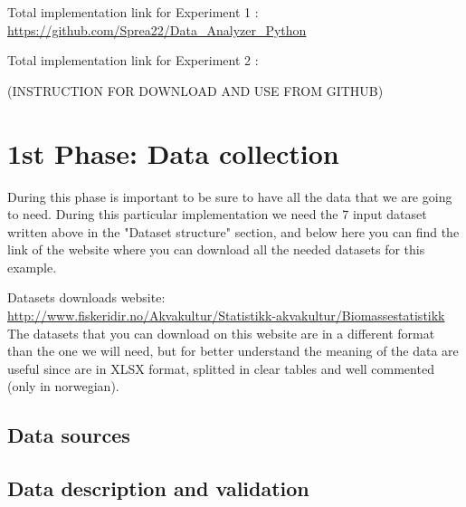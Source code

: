 

\hypersetup{
    colorlinks=true,
    linkcolor=blue,
    filecolor=magenta,      
    urlcolor=cyan,
}
Total implementation link for Experiment 1 : \\
\hyperlink{https://github.com/Sprea22/Data_Analyzer_Python}{https://github.com/Sprea22/Data\_Analyzer\_Python}

Total implementation link for Experiment 2 : \\
\url{}

(INSTRUCTION FOR DOWNLOAD AND USE FROM GITHUB)

\newpage
\section{1st Phase: Data collection}
During this phase is important to be sure to have all the data that we are going to need. During this particular implementation we need the 7 input dataset written above in the "Dataset structure" section, and below here you can find the link of the website where you can download all the needed datasets for this example.

Datasets downloads website:\\ 
\hyperlink{http://www.fiskeridir.no/Akvakultur/Statistikk-akvakultur/Biomassestatistikk} {http://www.fiskeridir.no/Akvakultur/Statistikk-akvakultur/Biomassestatistikk} \\

The datasets that you can download on this website are in a different format than the one we will need, but for better understand the meaning of the data are useful since are in XLSX format, splitted in clear tables and well commented (only in norwegian).

\subsection{Data sources}
\subsection{Data description and validation}

